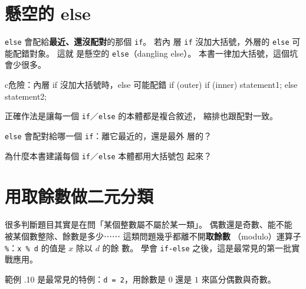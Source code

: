 \section{懸空的 else}
\label{sec:cond-dangling-else}

\texttt{else} 會配給\textbf{最近、還沒配對}的那個 \texttt{if}。 若內
層 \texttt{if} 沒加大括號，外層的 \texttt{else} 可能配錯對象。 這就
是懸空的 \texttt{else}（dangling else）。 本書一律加大括號，這個坑
會少很多。

\begin{code}{c}{危險：內層 if 沒加大括號時，else 可能配錯}
if (outer) {
    if (inner)
        statement1;
else
    statement2;
}
\end{code}

正確作法是讓每一個 \texttt{if}／\texttt{else} 的本體都是複合敘述，
縮排也跟配對一致。


\begin{drills}[label=drills:cond-dangling-else]
\item \texttt{else} 會配對給哪一個 \texttt{if}：離它最近的，還是最外
層的？
\item 為什麼本書建議每個 \texttt{if}／\texttt{else} 本體都用大括號包
起來？
\end{drills}

\section{用取餘數做二元分類}
\label{sec:cond-modulo}

很多判斷題目其實是在問「某個整數屬不屬於某一類」。 偶數還是奇數、能不能
被某個數整除、餘數是多少⋯⋯ 這類問題幾乎都離不開\textbf{取餘數}
（modulo）運算子 \texttt{\%}：\texttt{x \% d} 的值是 $x$ 除以 $d$ 的餘
數。 學會 \texttt{if-else} 之後，這是最常見的第一批實戰應用。


範例 \thechapter.10 是最常見的特例：\texttt{d = 2}，用餘數是 $0$ 還是
$1$ 來區分偶數與奇數。


